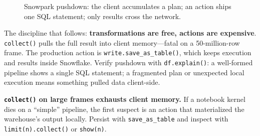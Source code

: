 \begin{figure}[H]
    \centering
    \caption{Snowpark pushdown: the client accumulates a plan; an action ships one SQL statement; only results cross the network.}
    \label{fig:chapter13-pushdown}
\end{figure}

The discipline that follows: \textbf{transformations are free, actions are expensive}. \texttt{collect()} pulls the full result into client memory---fatal on a 50-million-row frame. The production action is \texttt{write.save\_as\_table()}, which keeps execution and results inside Snowflake. Verify pushdown with \texttt{df.explain()}: a well-formed pipeline shows a single SQL statement; a fragmented plan or unexpected local execution means something pulled data client-side.

\begin{pitfall}
\textbf{\texttt{collect()} on large frames exhausts client memory.} If a notebook kernel dies on a ``simple'' pipeline, the first suspect is an action that materialized the warehouse's output locally. Persist with \texttt{save\_as\_table} and inspect with \texttt{limit(n).collect()} or \texttt{show(n)}.
\end{pitfall}

